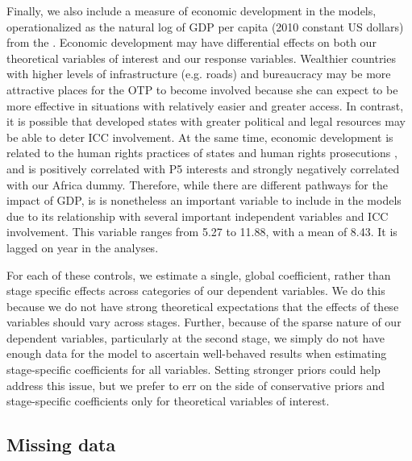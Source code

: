 Finally, we also include a measure of economic development in the models, operationalized as the natural log of GDP per capita (2010 constant US dollars) from the \citet{world2018world}.  Economic development may have differential effects on both our theoretical variables of interest and our response variables. Wealthier countries with higher levels of infrastructure (e.g. roads) and bureaucracy may be more attractive places for the OTP to become involved because she can expect to be more effective in situations with relatively easier and greater access. In contrast, it is possible that developed states with greater political and legal resources may be able to deter ICC involvement. At the same time, economic development is related to the human rights practices of states \citep{hill:jones:2014} and human rights prosecutions \cite{kim2012structural}, and is positively correlated with P5 interests and strongly negatively correlated with our Africa dummy. Therefore, while there are different pathways for the impact of GDP, is is nonetheless an important variable to include in the models due to its relationship with several important independent variables and ICC involvement. This variable ranges from 5.27 to 11.88, with a mean of 8.43. It is lagged on year in the analyses.

For each of these controls, we estimate a single, global coefficient, rather than stage specific effects across categories of our dependent variables. We do this because we do not have strong theoretical expectations that the effects of these variables should vary across stages. Further, because of the sparse nature of our dependent variables, particularly at the second stage, we simply do not have enough data for the model to ascertain well-behaved results when estimating stage-specific coefficients for all variables. Setting stronger priors could help address this issue, but we prefer to err on the side of conservative priors and stage-specific coefficients only for theoretical variables of interest.

\subsection*{Missing data}

